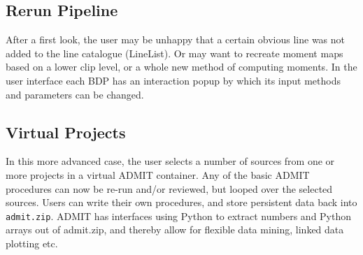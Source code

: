 \documentclass{article}
\begin{document}
\subsection{Rerun Pipeline}

After a first look, the user may be unhappy that a certain obvious line
was not added to the line catalogue (LineList). Or may want to recreate
moment maps based on a lower clip level, or a whole new method of
computing moments. In the user interface each BDP has an
interaction popup by which its input methods and parameters can be changed.

\subsection{Virtual Projects}

In this more advanced case, the user selects a number of sources from one
or more projects in a virtual ADMIT container. Any of the basic ADMIT procedures
can now be re-run and/or reviewed, but looped over the selected sources.
Users can write their own procedures,
and store persistent data back into {\tt admit.zip}. ADMIT has interfaces
using Python to extract numbers and Python arrays out of admit.zip, and thereby
allow for flexible data mining, linked data plotting etc.

%
%
%
%
%  
%
%
%
%
\end{document}
